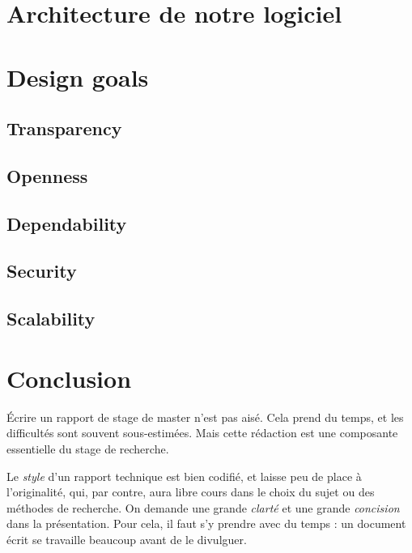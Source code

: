 \documentclass{ipgpmaster}
\begin{document}
\section{Architecture de notre logiciel}

\section{Design goals}
\subsection{Transparency}
\subsection{Openness}
\subsection{Dependability}
\subsection{Security}
\subsection{Scalability}

\section{Conclusion}

Écrire un rapport de stage de master n'est pas aisé. 
Cela prend du temps, et les difficultés sont souvent sous-estimées.
Mais cette rédaction est une composante essentielle du stage de recherche.

Le \emph{style\/} d'un rapport technique est bien codifié, et laisse peu de place
à l'originalité, qui, par contre, aura libre cours dans le choix du sujet
ou des méthodes de recherche. On demande une grande \emph{ clarté\/} et une grande 
\emph{concision\/} dans la présentation. 
Pour cela, il faut s'y prendre avec du temps : un document écrit se travaille 
beaucoup avant de le divulguer.

 
\newpage


            

\cleardoublepage
  
\end{document}
